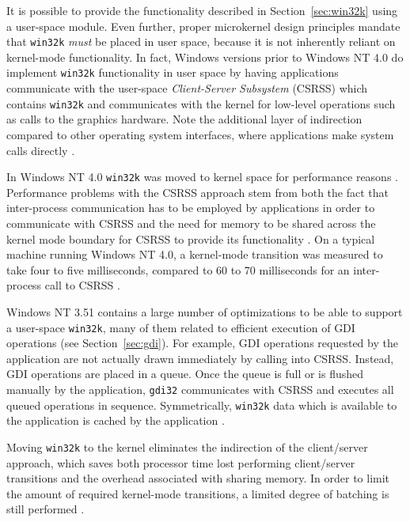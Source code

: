 			It is possible to provide the functionality described in
			Section~\ref{sec:win32k} using a user-space module. Even further,
			proper microkernel design principles mandate that \texttt{win32k}
			\emph{must} be placed in user space, because it is not inherently
			reliant on kernel-mode functionality.  In fact, Windows versions
			prior to Windows NT 4.0 do implement \texttt{win32k} functionality
			in user space by having applications communicate with the
			user-space \textit{Client-Server Subsystem} (CSRSS) which contains
			\texttt{win32k} and communicates with the kernel for low-level
			operations such as calls to the graphics hardware. Note the
			additional layer of indirection compared to other operating system
			interfaces, where applications make system calls directly
			\cite{gdikernel}.

			In Windows NT 4.0 \texttt{win32k} was moved to kernel space for
			performance reasons \cite{gdikernel}. Performance problems with the
			CSRSS approach stem from both the fact that inter-process
			communication has to be employed by applications in order to
			communicate with CSRSS and the need for memory to be shared across
			the kernel mode boundary for CSRSS to provide its functionality
			\cite{gdikernel}. On a typical machine running Windows NT 4.0, a
			kernel-mode transition was measured to take four to five
			milliseconds, compared to 60 to 70 milliseconds for an
			inter-process call to CSRSS \cite{gdikernel}.

			Windows NT 3.51 contains a large number of optimizations to be able
			to support a user-space \texttt{win32k}, many of them related to
			efficient execution of GDI operations (see Section~\ref{sec:gdi}).
			For example, GDI operations requested by the application are not
			actually drawn immediately by calling into CSRSS. Instead, GDI
			operations are placed in a queue. Once the queue is full or is
			flushed manually by the application, \texttt{gdi32} communicates
			with CSRSS and executes all queued operations in sequence.
			Symmetrically, \texttt{win32k} data which is available to the
			application is cached by the application \cite{gdikernel}.

			Moving \texttt{win32k} to the kernel eliminates the indirection of
			the client/server approach, which saves both processor time lost
			performing client/server transitions and the overhead associated
			with sharing memory. In order to limit the amount of required
			kernel-mode transitions, a limited degree of batching is still
			performed \cite{gdikernel}.

